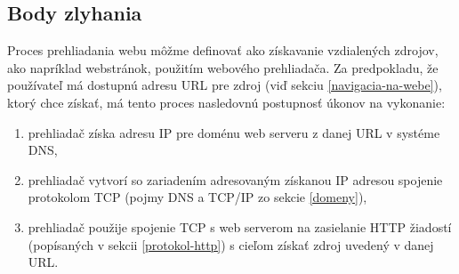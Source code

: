 
\pagebreak

\subsection{Body zlyhania}
\label{body-zlyhania}

Proces prehliadania webu môžme definovať ako získavanie vzdialených zdrojov, ako napríklad webstránok, použitím webového prehliadača.
Za predpokladu, že používateľ má dostupnú adresu URL pre zdroj (viď sekciu \ref{navigacia-na-webe}), 
ktorý chce získať, má tento proces nasledovnú postupnosť úkonov na vykonanie:

\begin{enumerate}
    \item prehliadač získa adresu IP pre doménu web serveru z danej URL v systéme DNS,
    
    \item prehliadač vytvorí so zariadením adresovaným získanou IP adresou spojenie protokolom TCP 
    (pojmy DNS a TCP/IP zo sekcie \ref{domeny}),
    
    \item prehliadač použije spojenie TCP s web serverom na zasielanie HTTP žiadostí 
    (popísaných v sekcii \ref{protokol-http}) s cieľom získať zdroj uvedený v danej URL.
\end{enumerate}

